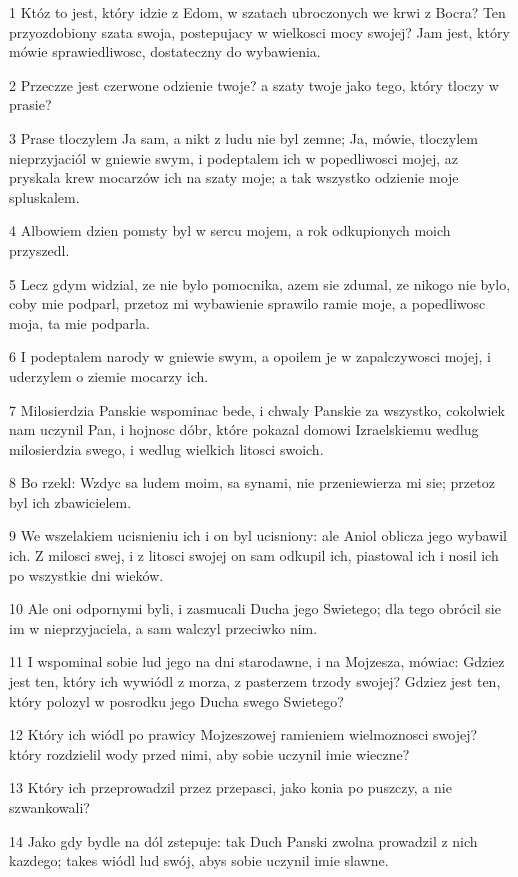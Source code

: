 \par 1 Któz to jest, który idzie z Edom, w szatach ubroczonych we krwi z Bocra? Ten przyozdobiony szata swoja, postepujacy w wielkosci mocy swojej? Jam jest, który mówie sprawiedliwosc, dostateczny do wybawienia.
\par 2 Przeczze jest czerwone odzienie twoje? a szaty twoje jako tego, który tloczy w prasie?
\par 3 Prase tloczylem Ja sam, a nikt z ludu nie byl zemne; Ja, mówie, tloczylem nieprzyjaciól w gniewie swym, i podeptalem ich w popedliwosci mojej, az pryskala krew mocarzów ich na szaty moje; a tak wszystko odzienie moje spluskalem.
\par 4 Albowiem dzien pomsty byl w sercu mojem, a rok odkupionych moich przyszedl.
\par 5 Lecz gdym widzial, ze nie bylo pomocnika, azem sie zdumal, ze nikogo nie bylo, coby mie podparl, przetoz mi wybawienie sprawilo ramie moje, a popedliwosc moja, ta mie podparla.
\par 6 I podeptalem narody w gniewie swym, a opoilem je w zapalczywosci mojej, i uderzylem o ziemie mocarzy ich.
\par 7 Milosierdzia Panskie wspominac bede, i chwaly Panskie za wszystko, cokolwiek nam uczynil Pan, i hojnosc dóbr, które pokazal domowi Izraelskiemu wedlug milosierdzia swego, i wedlug wielkich litosci swoich.
\par 8 Bo rzekl: Wzdyc sa ludem moim, sa synami, nie przeniewierza mi sie; przetoz byl ich zbawicielem.
\par 9 We wszelakiem ucisnieniu ich i on byl ucisniony: ale Aniol oblicza jego wybawil ich. Z milosci swej, i z litosci swojej on sam odkupil ich, piastowal ich i nosil ich po wszystkie dni wieków.
\par 10 Ale oni odpornymi byli, i zasmucali Ducha jego Swietego; dla tego obrócil sie im w nieprzyjaciela, a sam walczyl przeciwko nim.
\par 11 I wspominal sobie lud jego na dni starodawne, i na Mojzesza, mówiac: Gdziez jest ten, który ich wywiódl z morza, z pasterzem trzody swojej? Gdziez jest ten, który polozyl w posrodku jego Ducha swego Swietego?
\par 12 Który ich wiódl po prawicy Mojzeszowej ramieniem wielmoznosci swojej? który rozdzielil wody przed nimi, aby sobie uczynil imie wieczne?
\par 13 Który ich przeprowadzil przez przepasci, jako konia po puszczy, a nie szwankowali?
\par 14 Jako gdy bydle na dól zstepuje: tak Duch Panski zwolna prowadzil z nich kazdego; takes wiódl lud swój, abys sobie uczynil imie slawne.
